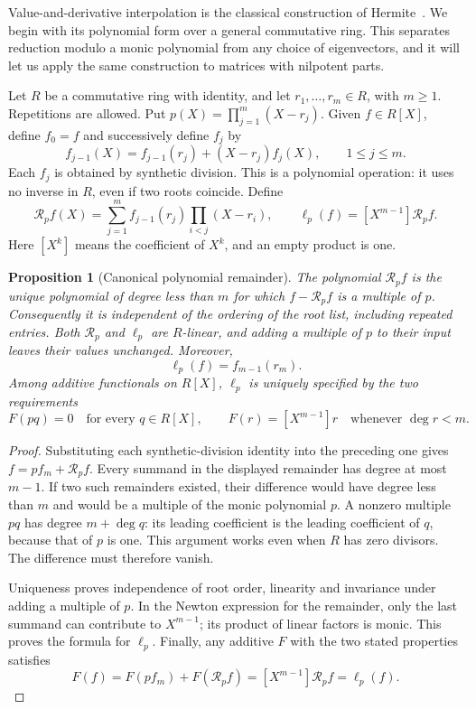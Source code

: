 \documentclass[11pt]{article}
\numberwithin{equation}{section}
\newtheorem{proposition}[theorem]{Proposition}
\theoremstyle{definition}\newtheorem{definition}[theorem]{Definition}
\theoremstyle{remark}\newtheorem{remark}[theorem]{Remark}
\begin{document}
Value-and-derivative interpolation is the classical construction of
Hermite~\cite{Hermite1878}. We begin with its polynomial form over a
general commutative ring. This separates reduction modulo a monic
polynomial from any choice of eigenvectors, and it will let us apply
the same construction to matrices with nilpotent parts.

Let \(R\) be a commutative ring with identity, and let
\(r_1,\ldots,r_m\in R\), with \(m\ge1\). Repetitions are allowed.
Put \(p(X)=\prod_{j=1}^m(X-r_j)\). Given \(f\in R[X]\), define
\(f_0=f\) and successively define \(f_j\) by
\[
 f_{j-1}(X)=f_{j-1}(r_j)+(X-r_j)f_j(X),\qquad 1\le j\le m.
\]
Each \(f_j\) is obtained by synthetic division. This is a polynomial
operation: it uses no inverse in \(R\), even if two roots coincide.
Define
\[
 \mathcal R_p f(X)=
 \sum_{j=1}^m f_{j-1}(r_j)\prod_{i<j}(X-r_i),
 \qquad
 \ell_p(f)=[X^{m-1}]\mathcal R_p f.
\]
Here \([X^k]\) means the coefficient of \(X^k\), and an empty
product is one.

\begin{proposition}[Canonical polynomial remainder]
\label{prop:canonical-polynomial-remainder}
The polynomial \(\mathcal R_p f\) is the unique polynomial of degree
less than \(m\) for which \(f-\mathcal R_p f\) is a multiple of
\(p\). Consequently it is independent of the ordering of the root
list, including repeated entries. Both \(\mathcal R_p\) and
\(\ell_p\) are \(R\)-linear, and adding a multiple of \(p\) to
their input leaves their values unchanged. Moreover,
\[
 \ell_p(f)=f_{m-1}(r_m).
\]
Among additive functionals on \(R[X]\), \(\ell_p\) is uniquely
specified by the two requirements
\[
 F(pq)=0\quad\text{for every }q\in R[X],\qquad
 F(r)=[X^{m-1}]r\quad\text{whenever }\deg r<m.
\]
\end{proposition}

\begin{proof}
Substituting each synthetic-division identity into the preceding one
gives \(f=p f_m+\mathcal R_p f\). Every summand in the displayed
remainder has degree at most \(m-1\). If two such remainders existed,
their difference would have degree less than \(m\) and would be a
multiple of the monic polynomial \(p\). A nonzero multiple \(pq\)
has degree \(m+\deg q\): its leading coefficient is the leading
coefficient of \(q\), because that of \(p\) is one. This argument
works even when \(R\) has zero divisors. The difference must therefore
vanish.

Uniqueness proves independence of root order, linearity and invariance
under adding a multiple of \(p\). In the Newton expression for the
remainder, only the last summand can contribute to \(X^{m-1}\);
its product of linear factors is monic. This proves the formula for
\(\ell_p\). Finally, any additive \(F\) with the two stated
properties satisfies
\[
 F(f)=F(pf_m)+F(\mathcal R_p f)
      =[X^{m-1}]\mathcal R_p f=\ell_p(f).
\]
\end{proof}
\end{document}
